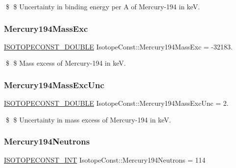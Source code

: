\$ \$ Uncertainty in binding energy per A of Mercury-\/194 in keV. \mbox{\label{group___isotope_const-_mercury-_hg194_gafc37605c0c931d3d07972ad6bf4dd682}} 
\subsubsection{\texorpdfstring{Mercury194\+Mass\+Exc}{Mercury194MassExc}}
{\footnotesize\ttfamily \mbox{\hyperlink{group___isotope_const-_macros_ga8f45a7272ce02c0b4c65c44636ed719a}{I\+S\+O\+T\+O\+P\+E\+C\+O\+N\+S\+T\+\_\+\+D\+O\+U\+B\+LE}} Isotope\+Const\+::\+Mercury194\+Mass\+Exc = -\/32183.}

\$ \$ Mass excess of Mercury-\/194 in keV. \mbox{\label{group___isotope_const-_mercury-_hg194_ga6fc8976e3786d9041737e7042a890e11}} 
\subsubsection{\texorpdfstring{Mercury194\+Mass\+Exc\+Unc}{Mercury194MassExcUnc}}
{\footnotesize\ttfamily \mbox{\hyperlink{group___isotope_const-_macros_ga8f45a7272ce02c0b4c65c44636ed719a}{I\+S\+O\+T\+O\+P\+E\+C\+O\+N\+S\+T\+\_\+\+D\+O\+U\+B\+LE}} Isotope\+Const\+::\+Mercury194\+Mass\+Exc\+Unc = 2.}

\$ \$ Uncertainty in mass excess of Mercury-\/194 in keV. \mbox{\label{group___isotope_const-_mercury-_hg194_gad871e1a8bee28a17c706f7f4f2bf7efe}} 
\subsubsection{\texorpdfstring{Mercury194\+Neutrons}{Mercury194Neutrons}}
{\footnotesize\ttfamily \mbox{\hyperlink{group___isotope_const-_macros_ga5f18360b3e99483a35c32d789e62621c}{I\+S\+O\+T\+O\+P\+E\+C\+O\+N\+S\+T\+\_\+\+I\+NT}} Isotope\+Const\+::\+Mercury194\+Neutrons = 114}

